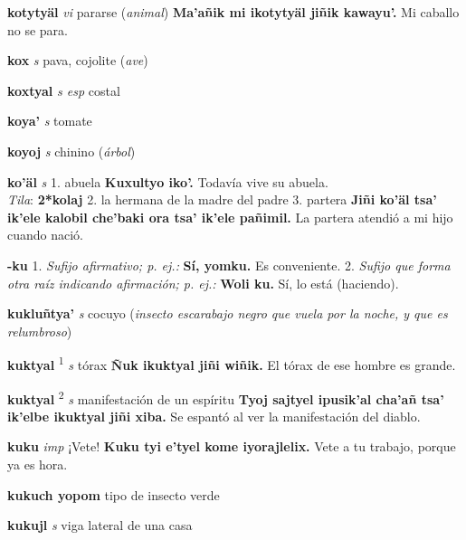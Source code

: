 \documentclass[10pt]{scrbook}
\newcommand{\entry}[1]{\textbf{#1}}
\newcommand{\onedefinition}[1]{#1.}
\newcommand{\defsuperscript}[1]{\textsuperscript{#1}}
\newcommand{\nontranslationdef}[1]{\textit{#1}}
\newcommand{\partofspeech}[1]{\textit{#1}}
\newcommand{\spanishtranslation}[1]{#1}
\newcommand{\clarification}[1]{(\textit{#1})}
\newcommand{\cholexample}[1]{\textbf{#1}}
\newcommand{\exampletranslation}[1]{#1}
\newcommand{\dialectvariant}[1]{\\\textit{#1}:}
\newcommand{\dialectword}[1]{\textbf{#1}}
\begin{document}
\begin{multicols}{2}
\entry{kotytyäl}
\partofspeech{vi}
\spanishtranslation{pararse}
\clarification{animal}
\cholexample{Ma'añik mi ikotytyäl jiñik kawayu'.}
\exampletranslation{Mi caballo no se para.}

\entry{kox}
\partofspeech{s}
\spanishtranslation{pava, cojolite}
\clarification{ave}

\entry{koxtyal}
\partofspeech{s esp}
\spanishtranslation{costal}

\entry{koya'}
\partofspeech{s}
\spanishtranslation{tomate}

\entry{koyoj}
\partofspeech{s}
\spanishtranslation{chinino}
\clarification{árbol}

\entry{ko'äl}
\partofspeech{s}
\onedefinition{1}
\spanishtranslation{abuela}
\cholexample{Kuxultyo iko'.}
\exampletranslation{Todavía vive su abuela.}
\dialectvariant{Tila}
\dialectword{2*kolaj}
\onedefinition{2}
\spanishtranslation{la hermana de la madre del padre}
\onedefinition{3}
\spanishtranslation{partera}
\cholexample{Jiñi ko'äl tsa' ik'ele kalobil che'baki ora tsa' ik'ele pañimil.}
\exampletranslation{La partera atendió a mi hijo cuando nació.}

\entry{-ku}
\onedefinition{1}
\nontranslationdef{Sufijo afirmativo; p. ej.:}
\cholexample{Sí, yomku.}
\exampletranslation{Es conveniente.}
\onedefinition{2}
\nontranslationdef{Sufijo que forma otra raíz indicando afirmación; p. ej.:}
\cholexample{Woli ku.}
\exampletranslation{Sí, lo está (haciendo).}

\entry{kukluñtya'}
\partofspeech{s}
\spanishtranslation{cocuyo}
\clarification{insecto escarabajo negro que vuela por la noche, y que es relumbroso}

\entry{kuktyal}
\defsuperscript{1}
\partofspeech{s}
\spanishtranslation{tórax}
\cholexample{Ñuk ikuktyal jiñi wiñik.}
\exampletranslation{El tórax de ese hombre es grande.}

\entry{kuktyal}
\defsuperscript{2}
\partofspeech{s}
\spanishtranslation{manifestación de un espíritu}
\cholexample{Tyoj sajtyel ipusik'al cha'añ tsa' ik'elbe ikuktyal jiñi xiba.}
\exampletranslation{Se espantó al ver la manifestación del diablo.}

\entry{kuku}
\partofspeech{imp}
\spanishtranslation{¡Vete!}
\cholexample{Kuku tyi e'tyel kome iyorajlelix.}
\exampletranslation{Vete a tu trabajo, porque ya es hora.}

\entry{kukuch yopom}
\spanishtranslation{tipo de insecto verde}

\entry{kukujl}
\partofspeech{s}
\spanishtranslation{viga lateral de una casa}


\end{multicols}
\end{document}
